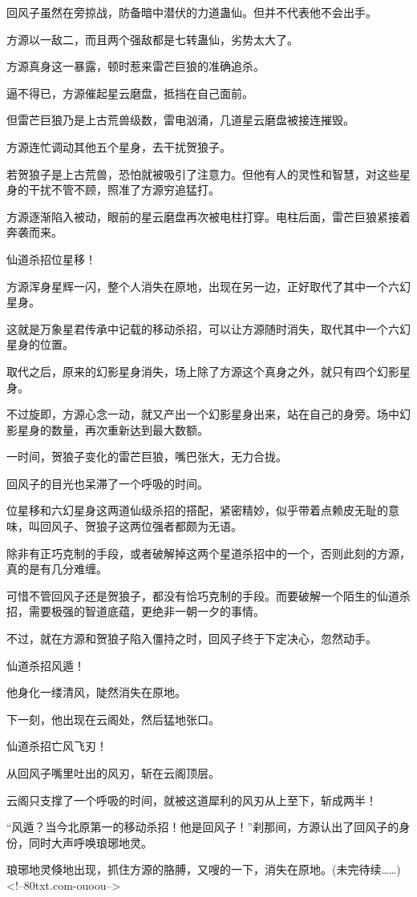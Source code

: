 \begin{this_body}
回风子虽然在旁掠战，防备暗中潜伏的力道蛊仙。但并不代表他不会出手。

方源以一敌二，而且两个强敌都是七转蛊仙，劣势太大了。

方源真身这一暴露，顿时惹来雷芒巨狼的准确追杀。

逼不得已，方源催起星云磨盘，抵挡在自己面前。

但雷芒巨狼乃是上古荒兽级数，雷电汹涌，几道星云磨盘被接连摧毁。

方源连忙调动其他五个星身，去干扰贺狼子。

若贺狼子是上古荒兽，恐怕就被吸引了注意力。但他有人的灵性和智慧，对这些星身的干扰不管不顾，照准了方源穷追猛打。

方源逐渐陷入被动，眼前的星云磨盘再次被电柱打穿。电柱后面，雷芒巨狼紧接着奔袭而来。

仙道杀招位星移！

方源浑身星辉一闪，整个人消失在原地，出现在另一边，正好取代了其中一个六幻星身。

这就是万象星君传承中记载的移动杀招，可以让方源随时消失，取代其中一个六幻星身的位置。

取代之后，原来的幻影星身消失，场上除了方源这个真身之外，就只有四个幻影星身。

不过旋即，方源心念一动，就又产出一个幻影星身出来，站在自己的身旁。场中幻影星身的数量，再次重新达到最大数额。

一时间，贺狼子变化的雷芒巨狼，嘴巴张大，无力合拢。

回风子的目光也呆滞了一个呼吸的时间。

位星移和六幻星身这两道仙级杀招的搭配，紧密精妙，似乎带着点赖皮无耻的意味，叫回风子、贺狼子这两位强者都颇为无语。

除非有正巧克制的手段，或者破解掉这两个星道杀招中的一个，否则此刻的方源，真的是有几分难缠。

可惜不管回风子还是贺狼子，都没有恰巧克制的手段。而要破解一个陌生的仙道杀招，需要极强的智道底蕴，更绝非一朝一夕的事情。

不过，就在方源和贺狼子陷入僵持之时，回风子终于下定决心，忽然动手。

仙道杀招风遁！

他身化一缕清风，陡然消失在原地。

下一刻，他出现在云阁处，然后猛地张口。

仙道杀招亡风飞刃！

从回风子嘴里吐出的风刃，斩在云阁顶层。

云阁只支撑了一个呼吸的时间，就被这道犀利的风刃从上至下，斩成两半！

“风遁？当今北原第一的移动杀招！他是回风子！”刹那间，方源认出了回风子的身份，同时大声呼唤琅琊地灵。

琅琊地灵倏地出现，抓住方源的胳膊，又嗖的一下，消失在原地。(未完待续……)<!--80txt.com-ouoou-->

\end{this_body}

